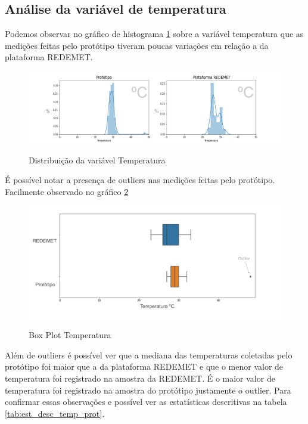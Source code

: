 \subsection{Análise da variável de temperatura}

Podemos observar no gráfico de histograma \ref{fig:dist_temperatura} sobre a variável temperatura que as medições feitas pelo protótipo tiveram poucas variações em relação a da plataforma REDEMET. 

\begin{figure} [!h]
    \centering
    \caption{Distribuição da variável Temperatura}    
    \includegraphics [scale = 0.5] {Figuras/dist_temp.png}
    \label{fig:dist_temperatura}
\end{figure}

É possível notar a presença de outliers nas medições feitas pelo protótipo. Facilmente observado no gráfico \ref{fig:box_temp}

\begin{figure} [!h]
    \centering
    \caption{Box Plot Temperatura}    
    \includegraphics [scale = 0.45] {Figuras/box_temp.png}
    \label{fig:box_temp}
\end{figure}

Além de outliers é possível ver que a mediana das temperaturas coletadas pelo protótipo foi maior que a da plataforma REDEMET e que o menor valor de temperatura foi registrado na amostra da REDEMET. É o maior valor de temperatura foi registrado na amostra do protótipo justamente o outlier. Para confirmar essas observações e possível ver as estatísticas descritivas na tabela \ref{tab:est_desc_temp_prot}.

